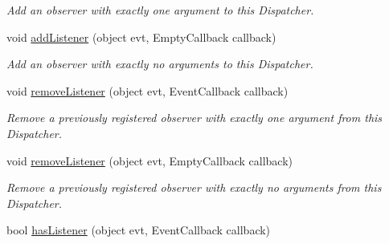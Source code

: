 \begin{DoxyCompactItemize}
\begin{DoxyCompactList}\small\item\em Add an observer with exactly one argument to this Dispatcher. \end{DoxyCompactList}\item 
\hypertarget{classstrange_1_1extensions_1_1dispatcher_1_1eventdispatcher_1_1impl_1_1_event_dispatcher_a47bf732c8a63525660c639fc0135a0f8}{void \hyperlink{classstrange_1_1extensions_1_1dispatcher_1_1eventdispatcher_1_1impl_1_1_event_dispatcher_a47bf732c8a63525660c639fc0135a0f8}{add\-Listener} (object evt, Empty\-Callback callback)}\label{classstrange_1_1extensions_1_1dispatcher_1_1eventdispatcher_1_1impl_1_1_event_dispatcher_a47bf732c8a63525660c639fc0135a0f8}

\begin{DoxyCompactList}\small\item\em Add an observer with exactly no arguments to this Dispatcher. \end{DoxyCompactList}\item 
\hypertarget{classstrange_1_1extensions_1_1dispatcher_1_1eventdispatcher_1_1impl_1_1_event_dispatcher_ae27f791e5bf48d6cf9ed98a11c0c8534}{void \hyperlink{classstrange_1_1extensions_1_1dispatcher_1_1eventdispatcher_1_1impl_1_1_event_dispatcher_ae27f791e5bf48d6cf9ed98a11c0c8534}{remove\-Listener} (object evt, Event\-Callback callback)}\label{classstrange_1_1extensions_1_1dispatcher_1_1eventdispatcher_1_1impl_1_1_event_dispatcher_ae27f791e5bf48d6cf9ed98a11c0c8534}

\begin{DoxyCompactList}\small\item\em Remove a previously registered observer with exactly one argument from this Dispatcher. \end{DoxyCompactList}\item 
\hypertarget{classstrange_1_1extensions_1_1dispatcher_1_1eventdispatcher_1_1impl_1_1_event_dispatcher_a0a339c2f88747c2c5240f6d5cfcde9cf}{void \hyperlink{classstrange_1_1extensions_1_1dispatcher_1_1eventdispatcher_1_1impl_1_1_event_dispatcher_a0a339c2f88747c2c5240f6d5cfcde9cf}{remove\-Listener} (object evt, Empty\-Callback callback)}\label{classstrange_1_1extensions_1_1dispatcher_1_1eventdispatcher_1_1impl_1_1_event_dispatcher_a0a339c2f88747c2c5240f6d5cfcde9cf}

\begin{DoxyCompactList}\small\item\em Remove a previously registered observer with exactly no arguments from this Dispatcher. \end{DoxyCompactList}\item 
\hypertarget{classstrange_1_1extensions_1_1dispatcher_1_1eventdispatcher_1_1impl_1_1_event_dispatcher_aaab911eac025732e0085dba0d55d436f}{bool \hyperlink{classstrange_1_1extensions_1_1dispatcher_1_1eventdispatcher_1_1impl_1_1_event_dispatcher_aaab911eac025732e0085dba0d55d436f}{has\-Listener} (object evt, Event\-Callback callback)}\label{classstrange_1_1extensions_1_1dispatcher_1_1eventdispatcher_1_1impl_1_1_event_dispatcher_aaab911eac025732e0085dba0d55d436f}


\end{DoxyCompactItemize}
